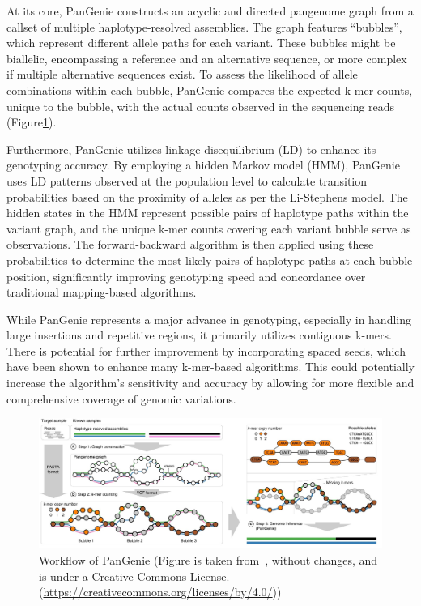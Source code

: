 \documentclass[PhD]{PHlab-thesis}
\begin{document}
At its core, PanGenie constructs an acyclic and directed pangenome graph from a callset of multiple haplotype-resolved assemblies. The graph features “bubbles”, which represent different allele paths for each variant. These bubbles might be biallelic, encompassing a reference and an alternative sequence, or more complex if multiple alternative sequences exist. To assess the likelihood of allele combinations within each bubble, PanGenie compares the expected k-mer counts, unique to the bubble, with the actual counts observed in the sequencing reads (Figure\ref{fig:PanGenie}). 

Furthermore, PanGenie utilizes linkage disequilibrium (LD) to enhance its genotyping accuracy. By employing a hidden Markov model (HMM), PanGenie uses LD patterns observed at the population level to calculate transition probabilities based on the proximity of alleles as per the Li-Stephens model. The hidden states in the HMM represent possible pairs of haplotype paths within the variant graph, and the unique k-mer counts covering each variant bubble serve as observations. The forward-backward algorithm is then applied using these probabilities to determine the most likely pairs of haplotype paths at each bubble position, significantly improving genotyping speed and concordance over traditional mapping-based algorithms.

While PanGenie represents a major advance in genotyping, especially in handling large insertions and repetitive regions, it primarily utilizes contiguous k-mers. There is potential for further improvement by incorporating spaced seeds, which have been shown to enhance many k-mer-based algorithms. This could potentially increase the algorithm's sensitivity and accuracy by allowing for more flexible and comprehensive coverage of genomic variations.
\vspace{4em}
\begin{figure}[H]
	\centering
	\includegraphics[scale=0.48]{figures/workflow of PanGenie.jpg}
	\caption{Workflow of PanGenie (Figure is taken from~\cite{elber2022PanGenie}, without changes, and is under a Creative Commons License.(\url{https://creativecommons.org/licenses/by/4.0/}))}
	\label{fig:PanGenie} %
\end{figure}
\clearpage
\end{document}
